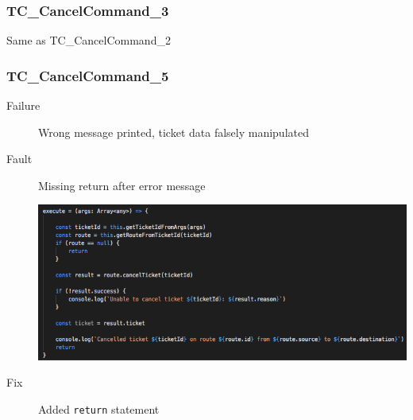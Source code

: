 \documentclass[11pt]{article}
\begin{document}
\subsubsection{TC\_CancelCommand\_3}
\label{sec:org6e20a8b}

Same as TC\_CancelCommand\_2

\subsubsection{TC\_CancelCommand\_5}
\label{sec:orga548309}

\begin{description}
\item[{Failure}] Wrong message printed, ticket data falsely manipulated
\item[{Fault}] Missing return after error message
\begin{center}
\includegraphics[width=.9\linewidth]{./Iteration3.rtfd/Pasted Graphic 13.tiff.png}
\end{center}
\item[{Fix}] Added \texttt{return} statement
\end{description}
\end{document}
